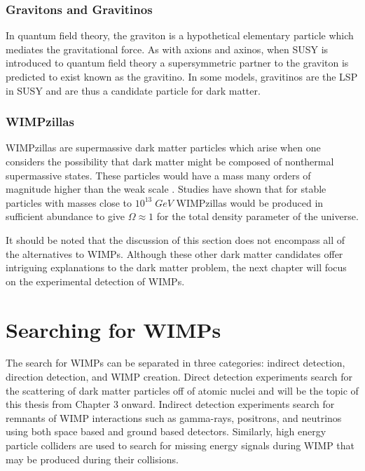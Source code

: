 \documentclass[a4paper,12pt]{article}
\begin{document}
\subsubsection{Gravitons and Gravitinos}
In quantum field theory, the graviton is a hypothetical  elementary particle which mediates the gravitational force.  As with axions and axinos, when SUSY is introduced to quantum field theory a supersymmetric partner to the graviton is predicted to exist known as the gravitino.  In some models, gravitinos are the LSP in SUSY and are thus a candidate particle for dark matter.

\subsubsection{WIMPzillas}
WIMPzillas are supermassive dark matter particles which arise when one considers the possibility that dark matter might be composed of nonthermal supermassive states. These particles would have a mass many orders of magnitude higher than the weak scale \cite{Chung}. Studies have shown that for stable particles with masses close to $10^{13} \; GeV$  WIMPzillas would be produced in sufficient abundance to give $\Omega \approx 1$ for the total density parameter of the universe.  

It should be noted that the discussion of this section does not encompass all of the alternatives to WIMPs.   Although these other dark matter candidates offer intriguing explanations to the dark matter problem, the next chapter will focus on the experimental detection of WIMPs.

\section{Searching for WIMPs} \label{Chapter2}

The search for WIMPs can be separated in three categories: indirect detection, direction detection, and WIMP creation. \cite{Bertone}  Direct detection experiments search for the scattering of dark matter particles off of atomic nuclei and will be the topic of this thesis from Chapter 3 onward. Indirect detection experiments search for remnants of WIMP interactions such as gamma-rays, positrons, and neutrinos using both space based and ground based detectors.  Similarly, high energy particle colliders are used to search for missing energy signals during WIMP that may be produced during their collisions.
\end{document}
